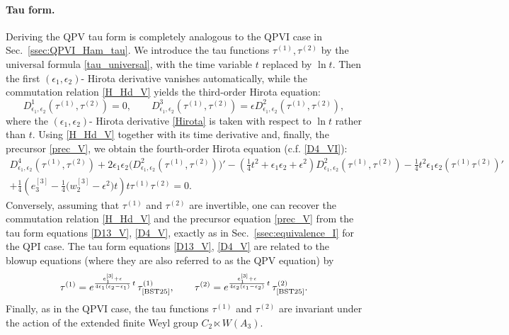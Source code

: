 \documentclass[12pt,a4paper]{article}
\numberwithin{equation}{section}
\begin{document}
\paragraph{Tau form.}
Deriving the QPV tau form is completely analogous to the QPVI case in Sec.~\ref{ssec:QPVI_Ham_tau}. We introduce the tau functions $\tau^{(1)},\tau^{(2)}$ by the universal formula \eqref{tau_universal}, with the time variable $t$ replaced by $\ln t$. Then the first $(\epsilon_1,\epsilon_2)$- Hirota derivative vanishes automatically, while the commutation relation \eqref{H_Hd_V} yields the third-order Hirota equation:
\begin{equation}\label{D13_V}
D^1_{\epsilon_1,\epsilon_2}\left(\tau^{(1)},\tau^{(2)}\right)=0, \qquad
D^3_{\epsilon_1,\epsilon_2}\left(\tau^{(1)},\tau^{(2)}\right)=\epsilon D^2_{\epsilon_1,\epsilon_2}\left(\tau^{(1)},\tau^{(2)}\right),
\end{equation}
where the $(\epsilon_1,\epsilon_2)$- Hirota derivative \eqref{Hirota} is taken with respect to $\ln t$ rather than $t$. Using \eqref{H_Hd_V} together with its time derivative and, finally, the precursor \eqref{prec_V}, we obtain the fourth-order Hirota equation (c.f. \eqref{D4_VI}):
\begin{multline}\label{D4_V}
D^4_{\epsilon_1,\epsilon_2}\left(\tau^{(1)},\tau^{(2)}\right)+2\epsilon_1\epsilon_2\big(D^2_{\epsilon_1,\epsilon_2}\left(\tau^{(1)},\tau^{(2)}\right)\big)'-\left(\frac14t^2{+}\epsilon_1\epsilon_2{+}\epsilon^2\right)D^2_{\epsilon_1,\epsilon_2}\left(\tau^{(1)},\tau^{(2)}\right)-\frac14t^2\epsilon_1\epsilon_2\left(\tau^{(1)}\tau^{(2)}\right)'\\+\frac14\left(e_3^{[3]}{-}\frac14\big(w_2^{[3]}{-}\epsilon^2\big)t\right)t\tau^{(1)}\tau^{(2)}=0.
\end{multline} 
Conversely, assuming that $\tau^{(1)}$ and $\tau^{(2)}$ are invertible, one can recover the commutation relation \eqref{H_Hd_V} and the precursor equation \eqref{prec_V} from the tau form equations \eqref{D13_V}, \eqref{D4_V}, exactly as in Sec.~\ref{ssec:equivalence_I} for the QPI case. 
The tau form equations \eqref{D13_V}, \eqref{D4_V} are related to the blowup equations \cite[(3.1),(3.2)]{BST25} (where they are also referred to as the QPV equation) by 
\begin{equation}\label{conn_V}
\tau^{(1)}=e^{\frac{e_1^{[3]}+\epsilon}{4\epsilon_1(\epsilon_2{-}\epsilon_1)}\,t}\,\tau^{(1)}_{\textrm{\cite{BST25}}}, \qquad   \tau^{(2)}=e^{\frac{e_1^{[3]}+\epsilon}{4\epsilon_2(\epsilon_1{-}\epsilon_2)}\,t}\,\tau^{(2)}_{\textrm{\cite{BST25}}}.
\end{equation}
Finally, as in the QPVI case, the tau functions $\tau^{(1)}$ and $\tau^{(2)}$ are invariant under the action of the extended finite Weyl group $C_2\ltimes W(A_3)$.
\end{document}
